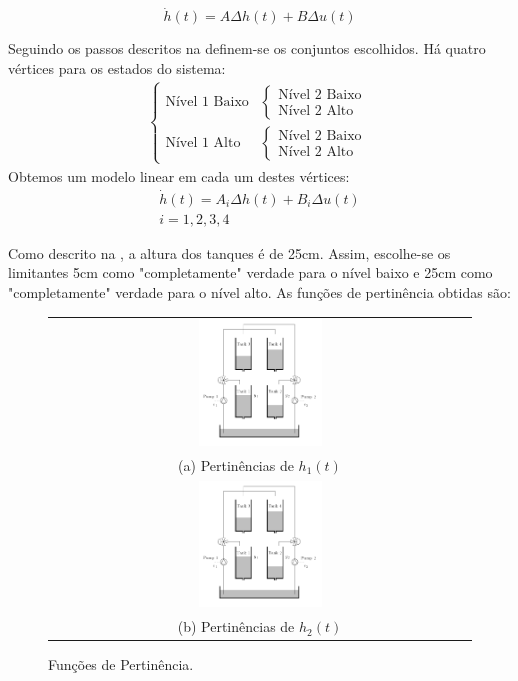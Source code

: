 	\begin{equation}
		\dot{h}(t) =  A \Delta h(t) +  B \Delta u(t)
	\end{equation}

Seguindo os passos descritos na  definem-se os conjuntos escolhidos. Há quatro vértices para os estados do sistema:
\begin{align}
	\begin{cases}
		\text{Nível 1 Baixo}
		&\begin{cases}
			\text{Nível 2 Baixo}\\
			\text{Nível 2 Alto}
		\end{cases}	\\
		\text{Nível 1 Alto}
		&\begin{cases}
			\text{Nível 2 Baixo}\\
			\text{Nível 2 Alto}
		\end{cases}
	\end{cases}
\end{align}
Obtemos um modelo linear em cada um destes vértices:
	\begin{align}
	\dot{h}(t) =  A_i \Delta h(t) +  B_i \Delta u(t) \\
	i = 1,2,3,4
	\end{align}


Como descrito na , a altura dos tanques é de 25cm. Assim, escolhe-se os limitantes 5cm como "completamente" verdade para o nível baixo e  25cm como "completamente" verdade para o nível alto. As funções de pertinência obtidas são:

\begin{figure}[H]
	\centering
	\begin{tabular}{c}
		\includegraphics[width=0.3\textwidth,keepaspectratio]{img/4tank.png}\\
		(a) Pertinências de $h_1(t)$ \\
		\includegraphics[width=0.3\textwidth,keepaspectratio]{img/4tank.png} \\
		(b) Pertinências de $h_2(t)$ \\
	\end{tabular}
	\caption{\label{figPertMod} Funções de Pertinência.}
\end{figure}


